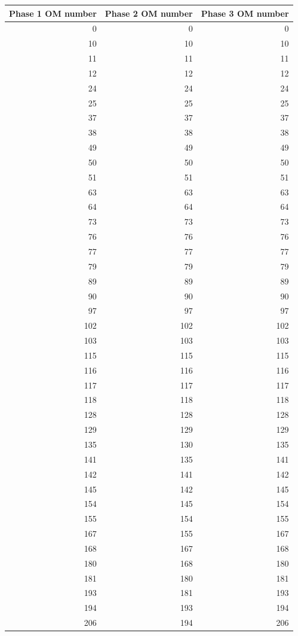 \begin{tabular}{rrr}
  \hline
  \textbf{Phase 1 OM number} & \textbf{Phase 2 OM number} & \textbf{Phase 3 OM number} \\\hline
  0 & 0 & 0 \\
  10 & 10 & 10 \\
  11 & 11 & 11 \\
  12 & 12 & 12 \\
  24 & 24 & 24 \\
  25 & 25 & 25 \\
  37 & 37 & 37 \\
  38 & 38 & 38 \\
  49 & 49 & 49 \\
  50 & 50 & 50 \\
  51 & 51 & 51 \\
  63 & 63 & 63 \\
  64 & 64 & 64 \\
  73 & 73 & 73 \\
  76 & 76 & 76 \\
  77 & 77 & 77 \\
  79 & 79 & 79 \\
  89 & 89 & 89 \\
  90 & 90 & 90 \\
  97 & 97 & 97 \\
  102 & 102 & 102 \\
  103 & 103 & 103 \\
  115 & 115 & 115 \\
  116 & 116 & 116 \\
  117 & 117 & 117 \\
  118 & 118 & 118 \\
  128 & 128 & 128 \\
  129 & 129 & 129 \\
  135 & 130 & 135 \\
  141 & 135 & 141 \\
  142 & 141 & 142 \\
  145 & 142 & 145 \\
  154 & 145 & 154 \\
  155 & 154 & 155 \\
  167 & 155 & 167 \\
  168 & 167 & 168 \\
  180 & 168 & 180 \\
  181 & 180 & 181 \\
  193 & 181 & 193 \\
  194 & 193 & 194 \\
  206 & 194 & 206 \\

\end{tabular}
